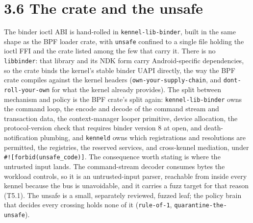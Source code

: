 \hypertarget{the-crate-and-the-unsafe}{%
\section{3.6 The crate and the unsafe}\label{the-crate-and-the-unsafe}}

The binder ioctl ABI is hand-rolled in \texttt{kennel-lib-binder}, built
in the same shape as the BPF loader crate, with \texttt{unsafe} confined
to a single file holding the ioctl FFI and the crate listed among the
few that carry it. There is no \texttt{libbinder}: that library and its
NDK form carry Android-specific dependencies, so the crate binds the
kernel's stable binder UAPI directly, the way the BPF crate compiles
against the kernel headers (\texttt{own-your-supply-chain}, and
\texttt{dont-roll-your-own} for what the kernel already provides). The
split between mechanism and policy is the BPF crate's split again:
\texttt{kennel-lib-binder} owns the command loop, the encode and decode
of the command stream and transaction data, the context-manager looper
primitive, device allocation, the protocol-version check that requires
binder version 8 at open, and death-notification plumbing, and
\texttt{kenneld} owns which registrations and resolutions are permitted,
the registries, the reserved services, and cross-kennel mediation, under
\texttt{\#!{[}forbid(unsafe\_code){]}}. The consequence worth stating is
where the untrusted input lands. The command-stream decoder consumes
bytes the workload controls, so it is an untrusted-input parser,
reachable from inside every kennel because the bus is unavoidable, and
it carries a fuzz target for that reason (T5.1). The unsafe is a small,
separately reviewed, fuzzed leaf; the policy brain that decides every
crossing holds none of it (\texttt{rule-of-1},
\texttt{quarantine-the-unsafe}).
